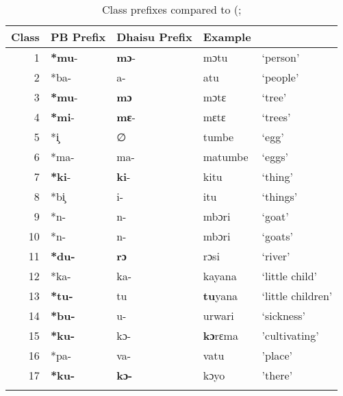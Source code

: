\documentclass[output=paper,colorlinks,citecolor=brown]{langscibook}
\begin{document}
\begin{table}%
\caption{Class prefixes compared to (\citealt[97]{Meeussen1967}; \citealt[14]{RugemaliraEtAl2019}}
\label{tab:ngonyani:14}
    \begin{tabularx}{\textwidth}{r XXX l}
    \lsptoprule
        Class & PB Prefix & Dhaisu Prefix & Example\\
    \midrule
        1 & \textbf{*mu}-   & \textbf{mɔ}-  & mɔtu              & ‘person’\\
        2 & *ba-            & a-            & atu               & ‘people’\\
        3 & \textbf{*mu}-   & \textbf{mɔ }  & mɔtɛ              & ‘tree’\\
        4 & \textbf{*mi}-   & \textbf{mɛ}-  & mɛtɛ              & ‘trees’\\
        5 & *i̧              & ∅             & tumbe             & ‘egg’\\
        6 & *ma-            & ma-           & matumbe           & ‘eggs’\\
        7 & \textbf{*ki}-   & \textbf{ki}-  & kitu              & ‘thing’\\
        8 & *bi̧             & i-            & itu               & ‘things’\\
        9 & *n-             & n-            & mbɔri             & ‘goat’\\
        10 & *n-            & n-            & mbɔri             & ‘goats’\\
        11 & \textbf{*du-}  & \textbf{rɔ}   & rɔsi              & ‘river’\\
        12 & *ka-           & ka-           & kayana            & ‘little child’\\
        13 & \textbf{*tu-}  & tu            & \textbf{tu}yana   & ‘little children’\\
        14 & \textbf{*bu-}  & u-            & urwari            & ‘sickness’\\
        15 & \textbf{*ku-}  & kɔ-           & \textbf{kɔ}rɛma   & 'cultivating'  \\
        16 & *pa-           & va-           & vatu              & 'place’\\
        17 & \textbf{*ku-}  & \textbf{kɔ-}  & kɔyo              & 'there' \\
    \lspbottomrule
    \end{tabularx}
\end{table}
\end{document}
